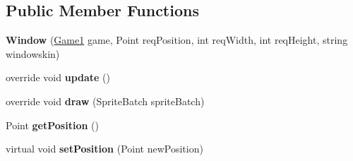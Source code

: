 \subsection*{Public Member Functions}
\begin{DoxyCompactItemize}
\item 
\hypertarget{class_simple_r_p_g_1_1_windows_1_1_window_a77106c03483ec65f3b86d1480f12c5f2}{{\bfseries Window} (\hyperlink{class_simple_r_p_g_1_1_game1}{Game1} game, Point req\-Position, int req\-Width, int req\-Height, string windowskin)}\label{class_simple_r_p_g_1_1_windows_1_1_window_a77106c03483ec65f3b86d1480f12c5f2}

\item 
\hypertarget{class_simple_r_p_g_1_1_windows_1_1_window_a341437b329d28975706528c71edb846f}{override void {\bfseries update} ()}\label{class_simple_r_p_g_1_1_windows_1_1_window_a341437b329d28975706528c71edb846f}

\item 
\hypertarget{class_simple_r_p_g_1_1_windows_1_1_window_aeb8ad1825472fb7413be3046ea74333d}{override void {\bfseries draw} (Sprite\-Batch sprite\-Batch)}\label{class_simple_r_p_g_1_1_windows_1_1_window_aeb8ad1825472fb7413be3046ea74333d}

\item 
\hypertarget{class_simple_r_p_g_1_1_windows_1_1_window_a83b744056d9d1eb19942c265fe2d6c2c}{Point {\bfseries get\-Position} ()}\label{class_simple_r_p_g_1_1_windows_1_1_window_a83b744056d9d1eb19942c265fe2d6c2c}

\item 
\hypertarget{class_simple_r_p_g_1_1_windows_1_1_window_a6fe3e4970c456d439434b822a572052f}{virtual void {\bfseries set\-Position} (Point new\-Position)}\label{class_simple_r_p_g_1_1_windows_1_1_window_a6fe3e4970c456d439434b822a572052f}


\end{DoxyCompactItemize}
